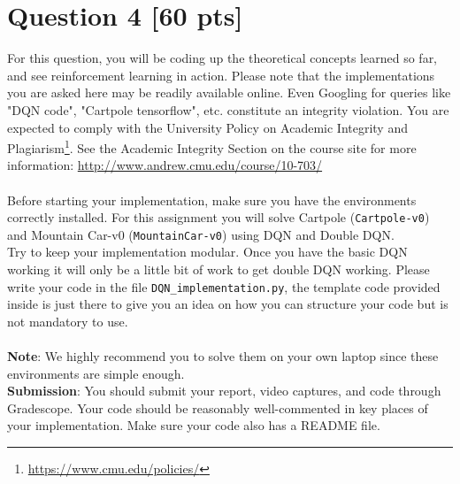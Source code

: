 \documentclass[12pt]{article}
\begin{document}
\section*{Question 4 \textbf{[60 pts]}}
For this question, you will be coding up the theoretical concepts learned so far, and see reinforcement learning in action. Please note that the implementations you are asked here may be readily available online. Even Googling for queries like "DQN code", "Cartpole tensorflow", etc. constitute an integrity violation. You are expected to comply with the University Policy on Academic Integrity and Plagiarism\footnote{\url{https://www.cmu.edu/policies/}}.  See the Academic Integrity Section on the course site for more information: \url{http://www.andrew.cmu.edu/course/10-703/}\\
\\
Before starting your implementation, make sure you have the environments correctly installed.
For this assignment you will solve Cartpole (\texttt{Cartpole-v0}) and Mountain Car-v0 (\texttt{MountainCar-v0}) using DQN and Double DQN. \\
Try to keep your implementation modular. Once you have the basic DQN working it will only be a little bit of work to get double DQN working. Please write your code in the file \texttt{DQN\_implementation.py}, the template code provided inside is just there to give you an idea on how you can structure your code but is not mandatory to use.\\
\\
\textbf{Note}: We highly recommend you to solve them on your own laptop since these environments are simple enough.  \\
\textbf{Submission}: You should submit  your report, video captures, and code through Gradescope. Your code should be reasonably well-commented in key places of your implementation. Make sure your code also has a README file.
\end{document}
